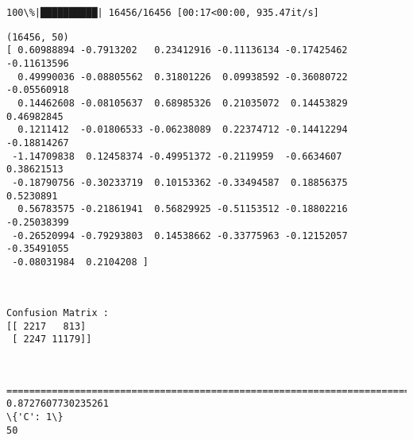 \documentclass[11pt]{article}
\begin{document}
    \begin{Verbatim}[commandchars=\\\{\}]
100\%|██████████| 16456/16456 [00:17<00:00, 935.47it/s] 

    \end{Verbatim}

    \begin{Verbatim}[commandchars=\\\{\}]
(16456, 50)
[ 0.60988894 -0.7913202   0.23412916 -0.11136134 -0.17425462 -0.11613596
  0.49990036 -0.08805562  0.31801226  0.09938592 -0.36080722 -0.05560918
  0.14462608 -0.08105637  0.68985326  0.21035072  0.14453829  0.46982845
  0.1211412  -0.01806533 -0.06238089  0.22374712 -0.14412294 -0.18814267
 -1.14709838  0.12458374 -0.49951372 -0.2119959  -0.6634607   0.38621513
 -0.18790756 -0.30233719  0.10153362 -0.33494587  0.18856375  0.5230891
  0.56783575 -0.21861941  0.56829925 -0.51153512 -0.18802216 -0.25038399
 -0.26520994 -0.79293803  0.14538662 -0.33775963 -0.12152057 -0.35491055
 -0.08031984  0.2104208 ]

    \end{Verbatim}

    \begin{center}
    \end{center}
    { \hspace*{\fill} \\}
    
    \begin{Verbatim}[commandchars=\\\{\}]
Confusion Matrix : 
[[ 2217   813]
 [ 2247 11179]]

    \end{Verbatim}

    \begin{center}
    \end{center}
    { \hspace*{\fill} \\}
    
    \begin{Verbatim}[commandchars=\\\{\}]
====================================================================================================
0.8727607730235261
\{'C': 1\}
50

    \end{Verbatim}
\end{document}

